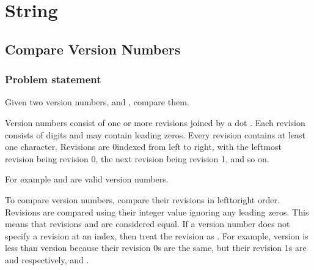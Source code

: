 \documentclass[letterpaper,12pt,english]{book}
\begin{document}
\sphinxstepscope


\chapter{String}
\label{\detokenize{String/index:string}}\label{\detokenize{String/index::doc}}
\sphinxstepscope


\section{Compare Version Numbers}
\label{\detokenize{String/08_STR_165_Compare_Version_Numbers:compare-version-numbers}}\label{\detokenize{String/08_STR_165_Compare_Version_Numbers::doc}}

\subsection{Problem statement\sphinxfootnotemark[25]}
\label{\detokenize{String/08_STR_165_Compare_Version_Numbers:problem-statement}}%
\begin{footnotetext}[25]\sphinxAtStartFootnote
{}
%
\end{footnotetext}\ignorespaces 
\sphinxAtStartPar
Given two version numbers,  and , compare them.

\sphinxAtStartPar
Version numbers consist of one or more revisions joined by a dot . Each revision consists of digits and may contain leading zeros. Every revision contains at least one character. Revisions are 0\sphinxhyphen{}indexed from left to right, with the leftmost revision being revision 0, the next revision being revision 1, and so on.

\sphinxAtStartPar
For example  and  are valid version numbers.

\sphinxAtStartPar
To compare version numbers, compare their revisions in left\sphinxhyphen{}to\sphinxhyphen{}right order. Revisions are compared using their integer value ignoring any leading zeros. This means that revisions  and  are considered equal. If a version number does not specify a revision at an index, then treat the revision as . For example, version  is less than version  because their revision 0s are the same, but their revision 1s are  and  respectively, and .
\end{document}
